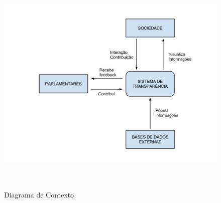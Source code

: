 \documentclass[12pt, a4paper]{article}
\begin{document}
        \begin{figure}[h]
            \centering
            \includegraphics[width=15cm,height=11cm]{final.jpg}
            \caption{Diagrama de Contexto}
            \label{fig:mesh1}
        \end{figure}
\end{document}
